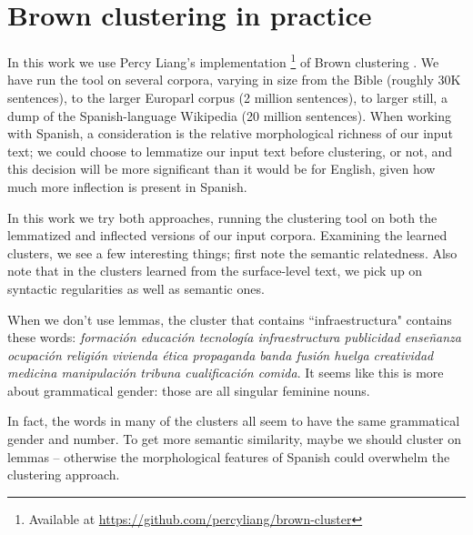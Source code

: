 \section{Brown clustering in practice}
In this work we use Percy Liang's implementation \footnote{Available at
\url{https://github.com/percyliang/brown-cluster}} of Brown clustering
\cite{Liang05semi-supervisedlearning}.
We have run the tool on several corpora, varying in size from the Bible
(roughly 30K sentences), to the larger Europarl corpus \cite{europarl} (2
million sentences), to larger still, a dump of the Spanish-language Wikipedia
(20 million sentences). When working with Spanish, a consideration is the
relative morphological richness of our input text; we could choose to lemmatize
our input text before clustering, or not, and this decision will be more
significant than it would be for English, given how much more inflection is
present in Spanish.

In this work we try both approaches, running the clustering tool on both the
lemmatized and inflected versions of our input corpora. Examining the learned
clusters, we see a few interesting things; first note the semantic
relatedness. Also note that in the clusters learned from the surface-level
text, we pick up on syntactic regularities as well as semantic ones.




When we don't use lemmas, the cluster that contains ``infraestructura" contains
these words: \emph{formación educación tecnología infraestructura publicidad
enseñanza ocupación religión vivienda ética propaganda banda fusión huelga
creatividad medicina manipulación tribuna cualificación comida}. It seems like
this is more about grammatical gender: those are all singular feminine nouns.

In fact, the words in many of the clusters all seem to have the same
grammatical gender and number. To get more semantic similarity, maybe we should
cluster on lemmas -- otherwise the morphological features of Spanish could
overwhelm the clustering approach.

